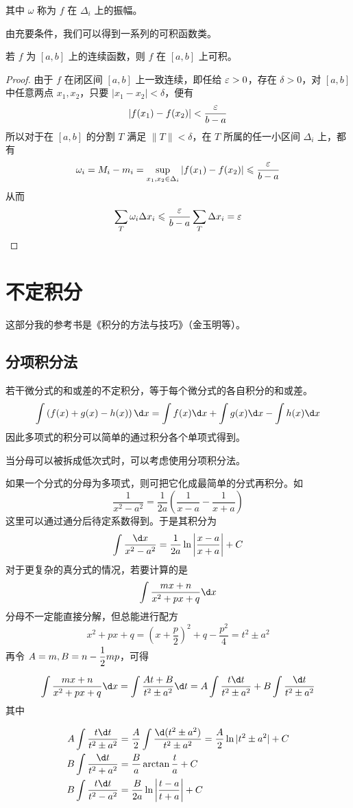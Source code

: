 其中 $\omega$ 称为 $f$ 在 $\Delta_i$ 上的振幅。

由充要条件，我们可以得到一系列的可积函数类。

\begin{theorem}
	若 $f$ 为 $[a,b]$ 上的连续函数，则 $f$ 在 $[a,b]$ 上可积。
\end{theorem}
\begin{proof}
	由于 $f$ 在闭区间 $[a,b]$ 上一致连续，即任给 $\varepsilon > 0$，存在 $\delta>0$，对 $[a,b]$ 中任意两点 $x_1,x_2$，只要 $|x_1-x_2|<\delta$，便有
	$$|f(x_1)-f(x_2)| < \frac{\varepsilon}{b-a}$$
	所以对于在 $[a,b]$ 的分割 $T$ 满足 $\|T\| < \delta$，在 $T$ 所属的任一小区间 $\Delta_i$ 上，都有
	$$\omega_i = M_i-m_i = \sup_{x_1,x_2\in\Delta_i}|f(x_1)-f(x_2)| \leqslant \frac{\varepsilon}{b-a}$$
	从而
	$$\sum_{T}\omega_i\Delta x_i \leqslant \frac{\varepsilon}{b-a}\sum_T\Delta x_i = \varepsilon$$
\end{proof}



\section{不定积分}

这部分我的参考书是《积分的方法与技巧》（金玉明等）。

\subsection{分项积分法}

若干微分式的和或差的不定积分，等于每个微分式的各自积分的和或差。
$$\int\left( f(x)+g(x)-h(x) \right)\d x = \int f(x)\d x + \int g(x)\d x - \int h(x)\d x$$
因此多项式的积分可以简单的通过积分各个单项式得到。

当分母可以被拆成低次式时，可以考虑使用分项积分法。

如果一个分式的分母为多项式，则可把它化成最简单的分式再积分。如
$$\frac{1}{x^2-a^2} = \frac{1}{2a}\left( \frac{1}{x-a}-\frac{1}{x+a} \right)$$
这里可以通过通分后待定系数得到。于是其积分为
$$\int \frac{\d x}{x^2-a^2} = \frac{1}{2a}\ln\left|\frac{x-a}{x+a}\right|+C$$
对于更复杂的真分式的情况，若要计算的是
$$\int \frac{mx+n}{x^2+px+q} \d x$$
分母不一定能直接分解，但总能进行配方
$$x^2+px+q = \left(x+\frac{p}{2}\right)^2+q-\frac{p^2}{4} = t^2 \pm a^2$$
再令 $A=m,B=n-\mfrac12mp$，可得
$$\int \frac{mx+n}{x^2+px+q} \d x = \int \frac{At+B}{t^2 \pm a^2} \d t
	= A\int \frac{t\d t}{t^2 \pm a^2} + B\int \frac{\d t}{t^2 \pm a^2}$$
其中

\[
	\begin{aligned}
		A\int \frac{t \d t}{t^2 \pm a^2} & = \frac{A}{2}\int \frac{\d(t^2 \pm a^2)}{t^2 \pm a^2} = \frac{A}{2} \ln|t^2 \pm a^2| +C \\
		B\int \frac{\d t}{t^2 + a^2}     & = \frac{B}{a}\arctan\frac{t}{a}+C                                                       \\
		B\int \frac{t \d t}{t^2 - a^2}   & = \frac{B}{2a}\ln\left|\frac{t-a}{t+a}\right|+C
	\end{aligned}
\]

